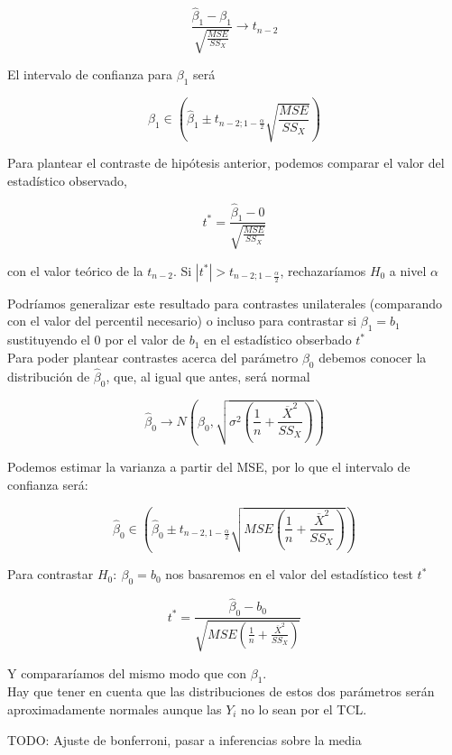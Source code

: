$$
\frac{\hat\beta_1-\beta_1}{\sqrt{\frac{MSE}{SS_{X}}}}\longrightarrow t_{n-2}
$$

El intervalo de confianza para $\beta_1$ será

$$
\beta_1\in\left(\hat\beta_1\pm t_{n-2;1-\frac{\alpha}{2}}\sqrt{\frac{MSE}{SS_X}}\right)
$$

Para plantear el contraste de hipótesis anterior, podemos comparar el valor del estadístico observado,

$$
t^*=\frac{\hat\beta_1-0}{\sqrt{\frac{MSE}{SS_X}}}
$$

con el valor teórico de la $t_{n-2}$. Si $|t^*|>t_{n-2;1-\frac{\alpha}{2}}$, rechazaríamos $H_0$ a nivel $\alpha$

Podríamos generalizar este resultado para contrastes unilaterales (comparando con el valor del percentil necesario) o incluso para contrastar si $\beta_1=b_1$ sustituyendo el 0 por el valor de $b_1$ en el estadístico obserbado $t^*$\\

Para poder plantear contrastes acerca del parámetro $\beta_0$ debemos conocer la distribución de $\hat\beta_0$, que, al igual que antes, será normal

$$
\hat\beta_0\longrightarrow N\left(\beta_0,\sqrt{\sigma^2\left(\frac{1}{n}+\frac{\overline{X}^2}{SS_X}\right)}\right)
$$

Podemos estimar la varianza a partir del MSE, por lo que el intervalo de confianza será:

$$
\hat\beta_0\in\left(\hat\beta_0\pm t_{n-2,1-\frac{\alpha}{2}}\sqrt{MSE\left(\frac{1}{n}+\frac{\overline{X}^2}{SS_X}\right)}\right)
$$

Para contrastar $H_0:\ \beta_0=b_0$ nos basaremos en el valor del estadístico test $t^*$

$$
t^*=\frac{\hat\beta_0-b_0}{\sqrt{MSE\left(\frac{1}{n}+\frac{\overline{X}^2}{SS_X}\right)}}
$$

Y compararíamos del mismo modo que con $\beta_1$.\\

Hay que tener en cuenta que las distribuciones de estos dos parámetros serán aproximadamente normales aunque las $Y_i$ no lo sean por el TCL.

TODO: Ajuste de bonferroni, pasar a inferencias sobre la media
